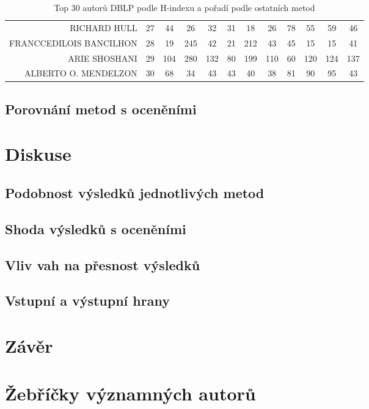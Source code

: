 \documentclass[12pt,titlepage]{report}
\begin{document}
\begin{table}[!ht]
\begin{center}
{\begin{small}
\begin{tabular}{r|ccccccccccc}
RICHARD HULL&27&44&26&32&31&18&26&78&55&59&46\\
FRANCCEDILOIS BANCILHON&28&19&245&42&21&212&43&45&15&15&41\\
ARIE SHOSHANI&29&104&280&132&80&199&110&60&120&124&137\\
ALBERTO O. MENDELZON&30&68&34&43&43&40&38&81&90&95&43\\
\bottomrule
\end{tabular}
\end{small}
}
\end{center}
\caption{Top 30 autorů DBLP podle H-indexu a pořadí podle ostatních metod}
\label{tab:corr1}
\end{table}


\section{Porovnání metod s oceněními}

\chapter{Diskuse}
\section{Podobnost výsledků jednotlivých metod}
\section{Shoda výsledků s oceněními}
\section{Vliv vah na přesnost výsledků}
\section{Vstupní a výstupní hrany}

\chapter{Závěr}




\clearpage\mbox{}\clearpage

\newpage
\appendix
\chapter{Žebříčky významných autorů}
\label{chapter:zebricky}
\end{document}
